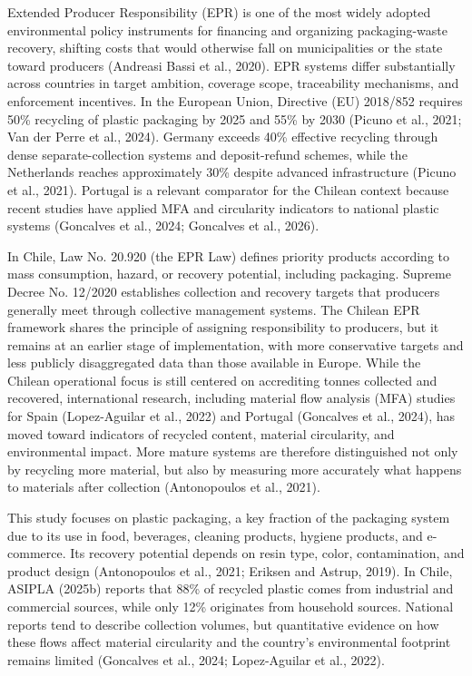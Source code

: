 \documentclass[review,10pt]{elsarticle}
\newcommand{\revpar}[1]{#1\par\medskip}
\DeclareRobustCommand{\change}[1]{#1}
\newcommand{\changepar}[1]{#1\par\medskip}
\begin{document}
\changepar{Extended Producer Responsibility (EPR) is one of the most widely adopted environmental policy instruments for financing and organizing packaging-waste recovery, shifting costs that would otherwise fall on municipalities or the state toward producers (Andreasi Bassi et al., 2020). EPR systems differ substantially across countries in target ambition, coverage scope, traceability mechanisms, and enforcement incentives. In the European Union, Directive (EU) 2018/852 requires 50\% recycling of plastic packaging by 2025 and 55\% by 2030 (Picuno et al., 2021; Van der Perre et al., 2024). Germany exceeds 40\% effective recycling through dense separate-collection systems and deposit-refund schemes, while the Netherlands reaches approximately 30\% despite advanced infrastructure (Picuno et al., 2021). Portugal is a relevant comparator for the Chilean context because recent studies have applied MFA and circularity indicators to national plastic systems (Goncalves et al., 2024; Goncalves et al., 2026).}

\revpar{In Chile, Law No. 20.920 (the EPR Law) defines priority products according to mass consumption, hazard, or recovery potential, including packaging. Supreme Decree No. 12/2020 establishes collection and recovery targets that producers generally meet through collective management systems. The Chilean EPR framework shares the principle of assigning responsibility to producers, but it remains at an earlier stage of implementation, with more conservative targets and less publicly disaggregated data than those available in Europe. While the Chilean operational focus is still centered on accrediting tonnes collected and recovered, international research, including material flow analysis (MFA) studies for Spain (Lopez-Aguilar et al., 2022) and Portugal (Goncalves et al., 2024), has moved toward indicators of recycled content, material circularity, and environmental impact. More mature systems are therefore distinguished not only by recycling more material, but also by measuring more accurately what happens to materials after collection (Antonopoulos et al., 2021).}

\revpar{This study focuses on plastic packaging, a key fraction of the packaging system due to its use in food, beverages, cleaning products, hygiene products, and e-commerce. Its recovery potential depends on resin type, color, contamination, and product design (Antonopoulos et al., 2021; \change{Eriksen and Astrup, 2019}). In Chile, \change{ASIPLA (2025b) reports that 88\% of recycled plastic comes from industrial and commercial sources, while only 12\% originates from household sources}. National reports tend to describe collection volumes, but quantitative evidence on how these flows affect material circularity and the country's environmental footprint remains limited (Goncalves et al., 2024; Lopez-Aguilar et al., 2022).}
\end{document}
